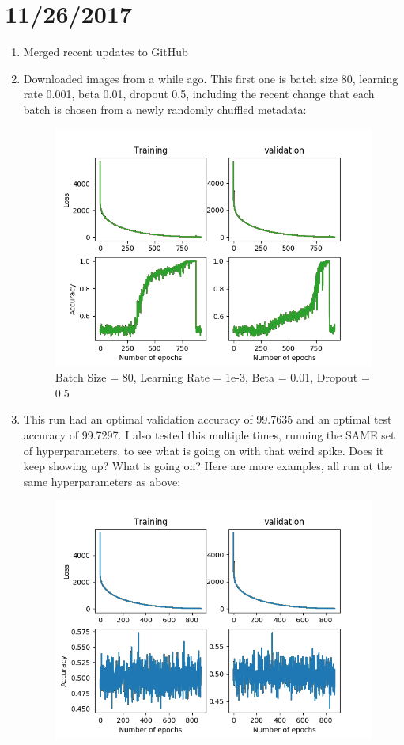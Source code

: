 \documentclass[12pt,reqno]{amsart}
\numberwithin{equation}{section}
\begin{document}
\section{11/26/2017}
\begin{enumerate}
\item Merged recent updates to GitHub
\item Downloaded images from a while ago.  This first one is batch size 80, learning rate 0.001, beta 0.01, dropout 0.5, including the recent change that each batch is chosen from a newly randomly chuffled metadata:
\begin{figure}[H]
\centering
\includegraphics[scale=0.6]{test-batch2-1e-3-80-1e-2-5e-1}
\caption{Batch Size = 80, Learning Rate = 1e-3, Beta = 0.01, Dropout = 0.5}
\end{figure}
\item This run had an optimal validation accuracy of 99.7635 and an optimal test accuracy of 99.7297.  I also tested this multiple times, running the SAME set of hyperparameters, to see what is going on with that weird spike.  Does it keep showing up?  What is going on?  Here are more examples, all run at the same hyperparameters as above:
\begin{figure}[H]
\centering
\includegraphics[scale=0.6]{learning-rate-rep1-1e-3-80-1e-2-5e-1}

\end{figure}
\end{enumerate}
\end{document}
